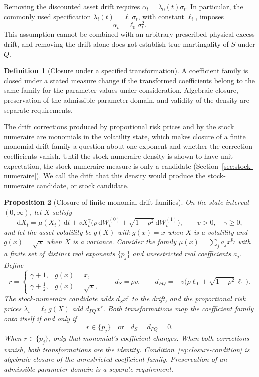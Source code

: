 \documentclass[11pt,a4paper]{article}
\newtheorem{proposition}{Proposition}[section]
\theoremstyle{definition}
\newtheorem{definition}[proposition]{Definition}
\theoremstyle{remark}
\newcommand{\dd}{\,\mathrm{d}}
\begin{document}
Removing the discounted asset drift requires \(\alpha_t=\lambda_0(t)\sigma_t\). In particular, the commonly used specification \(\lambda_i(t)=\ell_i\sigma_t\), with constant \(\ell_i\), imposes
\begin{equation}
 \alpha_t=\ell_0\sigma_t^2.
 \label{eq:compatible-risk-premium}
\end{equation}
This assumption cannot be combined with an arbitrary prescribed physical excess drift, and removing the drift alone does not establish true martingality of \(S\) under \(Q\).

\begin{definition}[Closure under a specified transformation]
A coefficient family is closed under a stated measure change if the transformed coefficients belong to the same family for the parameter values under consideration. Algebraic closure, preservation of the admissible parameter domain, and validity of the density are separate requirements.
\end{definition}

The drift corrections produced by proportional risk prices and by the stock numeraire are monomials in the volatility state, which makes closure of a finite monomial drift family a question about one exponent and whether the correction coefficients vanish. Until the stock-numeraire density is shown to have unit expectation, the stock-numeraire measure is only a candidate (Section~\ref{sec:stock-numeraire}). We call the drift that this density would produce the stock-numeraire candidate, or stock candidate.

\begin{proposition}[Closure of finite monomial drift families]
\label{prop:closure}
On the state interval \((0,\infty)\), let \(X\) satisfy
\[
 \dd X_t=\mu(X_t)\dd t+vX_t^{\gamma}\bigl(\rho\dd W_t^{(0)}+\sqrt{1-\rho^2}\dd W_t^{(1)}\bigr),
 \qquad v>0,\quad \gamma\geq0,
\]
and let the asset volatility be \(g(X)\) with \(g(x)=x\) when \(X\) is a volatility and \(g(x)=\sqrt{x}\) when \(X\) is a variance. Consider the family \(\mu(x)=\sum_{j}a_jx^{p_j}\) with a finite set of distinct real exponents \(\{p_j\}\) and unrestricted real coefficients \(a_j\). Define
\[
 r=\begin{cases}\gamma+1,&g(x)=x,\\\gamma+\tfrac12,&g(x)=\sqrt{x},\end{cases}
 \qquad d_S=\rho v,\qquad
 d_{PQ}=-v\bigl(\rho\ell_0+\sqrt{1-\rho^2}\,\ell_1\bigr).
\]
The stock-numeraire candidate adds \(d_Sx^r\) to the drift, and the proportional risk prices \(\lambda_i=\ell_ig(X)\) add \(d_{PQ}x^r\). Both transformations map the coefficient family onto itself if and only if
\begin{equation}
 r\in\{p_j\}\quad\text{or}\quad d_S=d_{PQ}=0.
 \label{eq:closure-condition}
\end{equation}
When \(r\in\{p_j\}\), only that monomial's coefficient changes. When both corrections vanish, both transformations are the identity. Condition~\eqref{eq:closure-condition} is algebraic closure of the unrestricted coefficient family. Preservation of an admissible parameter domain is a separate requirement.
\end{proposition}
\end{document}
